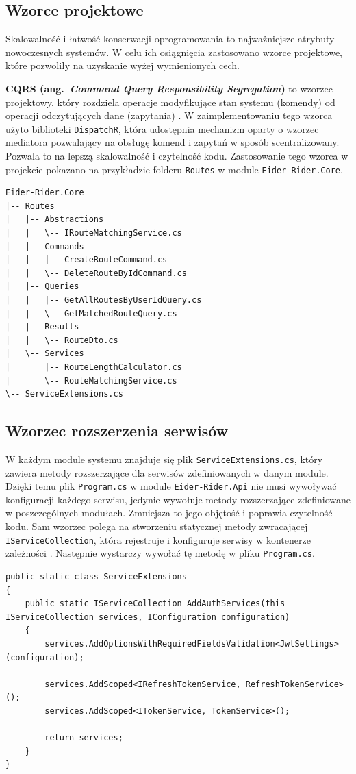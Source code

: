 \subsection{Wzorce projektowe}
Skalowalność i łatwość konserwacji oprogramowania to najważniejsze atrybuty nowoczesnych systemów. 
W celu ich osiągnięcia zastosowano wzorce projektowe, które pozwoliły na uzyskanie wyżej wymienionych cech.

\textbf{CQRS (ang.~\emph{Command Query Responsibility Segregation})} to wzorzec projektowy, który rozdziela operacje modyfikujące stan systemu (komendy) od operacji odczytujących dane (zapytania) \cite{MS_CQRS}.
W zaimplementowaniu tego wzorca użyto biblioteki \texttt{DispatchR}, która udostępnia mechanizm oparty o wzorzec mediatora pozwalający na obsługę komend i zapytań w sposób scentralizowany.
Pozwala to na lepszą skalowalność i czytelność kodu. Zastosowanie tego wzorca w projekcie pokazano na przykładzie folderu \texttt{Routes} w module \texttt{Eider-Rider.Core}.
\begin{lstlisting}[label=list:cqrsExample,caption=Przykład zastosowania wzorca CQRS w module Routes,style=folderview]
Eider-Rider.Core
|-- Routes
|   |-- Abstractions
|   |   \-- IRouteMatchingService.cs
|   |-- Commands
|   |   |-- CreateRouteCommand.cs
|   |   \-- DeleteRouteByIdCommand.cs
|   |-- Queries
|   |   |-- GetAllRoutesByUserIdQuery.cs
|   |   \-- GetMatchedRouteQuery.cs
|   |-- Results
|   |   \-- RouteDto.cs
|   \-- Services
|       |-- RouteLengthCalculator.cs
|       \-- RouteMatchingService.cs
\-- ServiceExtensions.cs
\end{lstlisting}
\subsection{Wzorzec rozszerzenia serwisów}
W każdym module systemu znajduje się plik \texttt{ServiceExtensions.cs}, który zawiera metody rozszerzające dla serwisów zdefiniowanych w danym module. 
Dzięki temu plik \texttt{Program.cs} w module \texttt{Eider-Rider.Api} nie musi wywoływać konfiguracji każdego serwisu, jedynie wywołuje metody rozszerzające zdefiniowane w poszczególnych modułach.
Zmniejsza to jego objętość i poprawia czytelność kodu.
Sam wzorzec polega na stworzeniu statycznej metody zwracającej \texttt{IServiceCollection}, która rejestruje i konfiguruje serwisy w kontenerze zależności \cite{SERVICE_EXTENSIONS}.
Następnie wystarczy wywołać tę metodę w pliku \texttt{Program.cs}.
\begin{lstlisting}[label=list:serviceExtensionsExample,caption=Przykład zastosowania wzorca rozszerzenia serwisów,style=sharpcstyle]
public static class ServiceExtensions
{
    public static IServiceCollection AddAuthServices(this IServiceCollection services, IConfiguration configuration)
    {
        services.AddOptionsWithRequiredFieldsValidation<JwtSettings>(configuration);
        
        services.AddScoped<IRefreshTokenService, RefreshTokenService>();
        services.AddScoped<ITokenService, TokenService>();
        
        return services;
    }
}
\end{lstlisting}
